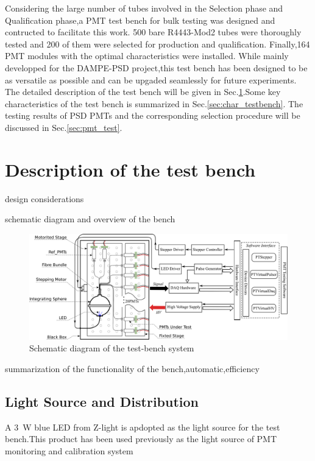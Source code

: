 \documentclass[preprint,3p,times]{elsarticle}
\begin{document}
Considering the large number of tubes involved in the Selection phase and Qualification phase,a PMT test bench for bulk testing was designed and contructed to facilitate this work.
500 bare R4443-Mod2 tubes were thoroughly tested and 200 of them were selected for production and qualification.
Finally,164 PMT modules with the optimal characteristics were installed.
While mainly developped for the DAMPE-PSD project,this test bench has been designed to be as versatile as possible and can be upgaded seamlessly for future experiments.
The detailed description of the test bench will be given in Sec.\ref{sec:description}.Some key characteristics of the test bench is summarized in Sec.\ref{sec:char_testbench}.
The testing results of PSD PMTs and the corresponding selection procedure will be discussed in Sec.\ref{sec:pmt_test}.

\section{Description of the test bench}
\label{sec:description}

design considerations

schematic diagram and overview of the bench
\begin{figure}[hb]
 \centering
 \includegraphics[width=160mm]{test_bench}
\caption{Schematic diagram of the test-bench system}
\label{fig:test_bench_overveiw}
\end{figure} 

summarization of the functionality of the bench,automatic,efficiency

\subsection{Light Source and Distribution}
\label{sec:light_source}

A 3~W blue LED from Z-light\cite{zlight} is apdopted as the light source for the test bench.This product has been used previously as the light source of PMT monitoring and calibration system\cite{yuyuhong_led} 
\end{document}
